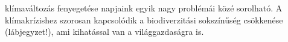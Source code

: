  klímaváltozás fenyegetése napjaink egyik nagy problémái közé sorolható. A klímakrízishez szorosan kapcsolódik a biodiverzitási sokszínűség csökkenése (lábjegyzet!), ami kihatással van a világgazdaságra is.
